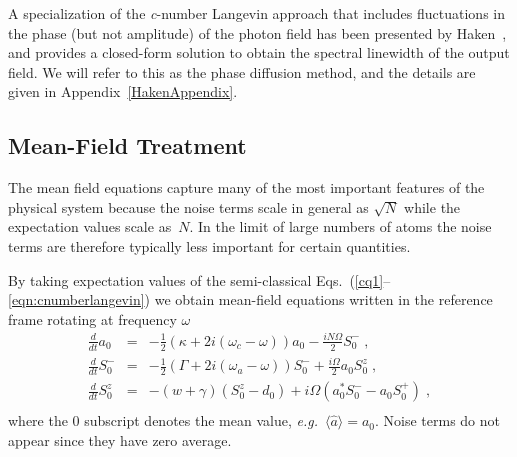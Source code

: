 \documentclass[aps,
twocolumn,
showpacs,
superscriptaddress,groupedaddress]{revtex4}
\begin{document}
A specialization of the \textit{c}-number Langevin approach that includes
fluctuations in the phase (but not amplitude) of the photon field has
been presented by Haken~\cite{HakenLaserBook}, and provides a
closed-form solution to obtain the spectral linewidth of the output
field. We will refer to this as the phase diffusion method, and the
details are given in Appendix~\ref{HakenAppendix}.


\subsection{Mean-Field Treatment}
\label{MFE}

The mean field equations capture many of the most important features of
the physical system because the noise terms scale in general as
$\sqrt{N}$ while the expectation values scale as~$N$.  In the limit of
large numbers of atoms the noise terms are therefore typically less
important for certain quantities.

By taking expectation values of the semi-classical
Eqs.~(\ref{cq1}--\ref{eqn:cnumberlangevin}) we obtain mean-field
equations written in the reference frame rotating at frequency
$\omega$
\begin{eqnarray}
\frac{d}{dt} a_0&=& -\frac{1}{2} (\kappa +2i(\omega_c-\omega)) a_0
-\frac{i N \Omega}{2} S_0^{-}\;,
\label{La0}\\
\frac{d}{dt} S_0^{-} &=&
-\frac{1}{2} \left(\Gamma +2 i (\omega_a-\omega) \right)  S_0^{-}
+\frac{i \Omega}{2} a_0 S_0^{z}\;,\\
\frac{d}{dt} S_0^{z} &=& -(w+\gamma)\left( S_0^{z} - d_0\right)
+i\Omega \left( a_0^{*} S_0^{-} - a_0 S_0^{+} \right)\;,\nonumber\\
\label{Lsz0}
\end{eqnarray}
where the $0$ subscript denotes the mean value, {\it e.g.}\ $\langle
\hat{a} \rangle =a_0$.  Noise terms do not appear since they have zero
average.
\end{document}
